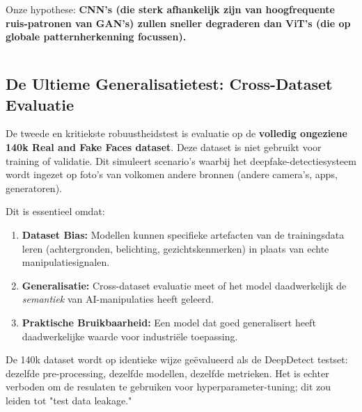 Onze hypothese: \textbf{CNN's (die sterk afhankelijk zijn van hoogfrequente ruis-patronen van GAN's) zullen sneller degraderen dan ViT's (die op globale patternherkenning focussen).}

\begin{listing}[H]
    \inputminted[fontsize=\footnotesize, linenos, frame=lines]{python}{code/jpeg_compression.py}
    \caption{Python script voor het JPEG-robuustheidsexperiment.}
    \label{lst:jpeg_compression}
\end{listing}



\subsection{De Ultieme Generalisatietest: Cross-Dataset Evaluatie}

De tweede en kritiekste robuustheidstest is evaluatie op de \textbf{volledig ongeziene 140k Real and Fake Faces dataset}. Deze dataset is niet gebruikt voor training of validatie. Dit simuleert scenario's waarbij het deepfake-detectiesysteem wordt ingezet op foto's van volkomen andere bronnen (andere camera's, apps, generatoren).

Dit is essentieel omdat:

\begin{enumerate}
    \item \textbf{Dataset Bias:} Modellen kunnen specifieke artefacten van de trainingsdata leren (achtergronden, belichting, gezichtskenmerken) in plaats van echte manipulatiesignalen.
    
    \item \textbf{Generalisatie:} Cross-dataset evaluatie meet of het model daadwerkelijk de \textit{semantiek} van AI-manipulaties heeft geleerd.
    
    \item \textbf{Praktische Bruikbaarheid:} Een model dat goed generalisert heeft daadwerkelijke waarde voor industriële toepassing.
\end{enumerate}

De 140k dataset wordt op identieke wijze geëvalueerd als de DeepDetect testset: dezelfde pre-processing, dezelfde modellen, dezelfde metrieken. Het is echter verboden om de resulaten te gebruiken voor hyperparameter-tuning; dit zou leiden tot "test data leakage."


